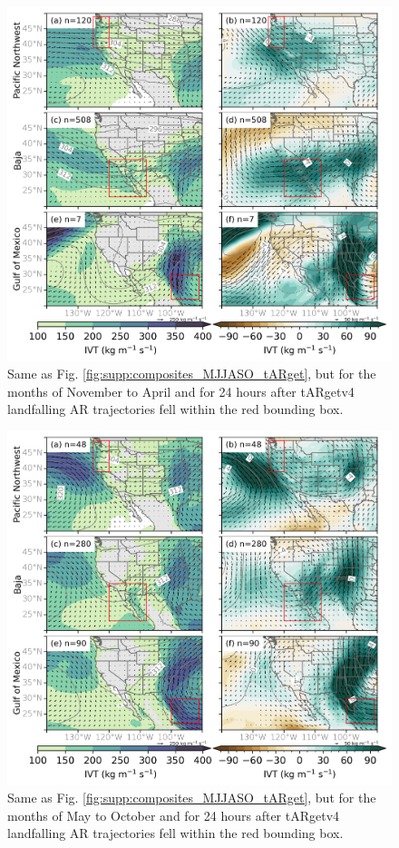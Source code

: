 \documentclass[draft,jgrga]{agutexSI2019}
\begin{document}
\begin{article}
\begin{figure}
\noindent\includegraphics[width=\textwidth]{figS10.png}
\caption{Same as Fig. \ref{fig:supp:composites_MJJASO_tARget}, but for the months of November to April and for 24 hours after tARgetv4 landfalling AR trajectories fell within the red bounding box.}
\label{fig:composites_NDJFMA_tARget_lag1}
\end{figure}

\begin{figure}
\noindent\includegraphics[width=\textwidth]{figS11.png}
\caption{Same as Fig. \ref{fig:supp:composites_MJJASO_tARget}, but for the months of May to October and for 24 hours after tARgetv4 landfalling AR trajectories fell within the red bounding box.}
\label{fig:composites_MJJASO_tARget_lag1}
\end{figure}


\end{article}
\end{document}
